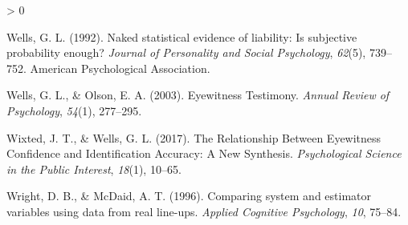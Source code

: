 \documentclass[
  10pt,
  dvipsnames,enabledeprecatedfontcommands]{scrartcl}
\newlength{\cslhangindent}
\newenvironment{CSLReferences}[2] %
 {%
  \setlength{\parindent}{0pt}
  \ifodd #1 \everypar{\setlength{\hangindent}{\cslhangindent}}\ignorespaces\fi
  \ifnum #2 > 0
  \setlength{\parskip}{#2\baselineskip}
  \fi
 }%
 {}
\begin{document}
\begin{CSLReferences}{1}{0}
\leavevmode\hypertarget{ref-wells1992naked}{}%
Wells, G. L. (1992). Naked statistical evidence of liability: Is
subjective probability enough? \emph{Journal of Personality and Social
Psychology}, \emph{62}(5), 739--752. American Psychological Association.

\leavevmode\hypertarget{ref-wells2003EyewitnessTestimony}{}%
Wells, G. L., \& Olson, E. A. (2003). Eyewitness {Testimony}.
\emph{Annual Review of Psychology}, \emph{54}(1), 277--295.

\leavevmode\hypertarget{ref-wixted2017RelationshipEyewitnessConfidence}{}%
Wixted, J. T., \& Wells, G. L. (2017). The {Relationship Between
Eyewitness Confidence} and {Identification Accuracy}: {A New Synthesis}.
\emph{Psychological Science in the Public Interest}, \emph{18}(1),
10--65.

\leavevmode\hypertarget{ref-Wright1996ComparingSystemEstimator}{}%
Wright, D. B., \& McDaid, A. T. (1996). Comparing system and estimator
variables using data from real line-ups. \emph{Applied Cognitive
Psychology}, \emph{10}, 75--84.

\end{CSLReferences}
\end{document}
